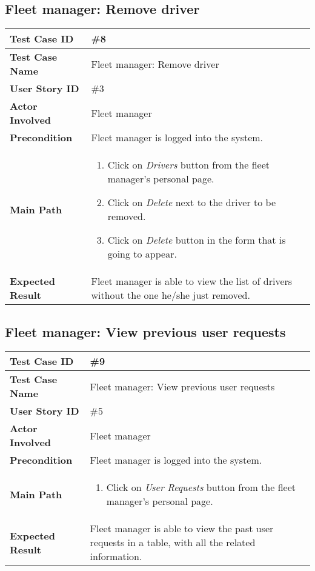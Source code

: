 \subsection{Fleet manager: Remove driver}
\begin{center}
	\begin{tabular} { | m{3.5cm} | m{9.5cm} | }
		\hline
		\textbf{Test Case ID} & \#8\\
		\hline
		\textbf{Test Case Name} & Fleet manager: Remove driver\\
		\hline
		\textbf{User Story ID} & \#3 \\
		\hline
		\textbf{Actor Involved} & Fleet manager\\
		\hline
		\textbf{Precondition} & Fleet manager is logged into the system.\\
		\hline
		\textbf{Main Path} & 
		\begin{enumerate}
			\item Click on \textit{Drivers} button from the fleet manager's personal page.
			\item Click on \textit{Delete} next to the driver to be removed.
			\item Click on \textit{Delete} button in the form that is going to appear.
		\end{enumerate}\\
		\hline
		\textbf{Expected Result} & Fleet manager is able to view the list of drivers without the one he/she just removed.\\
		\hline
	\end{tabular}
\end{center}

\subsection{Fleet manager: View previous user requests}
\begin{center}
	\begin{tabular} { | m{3.5cm} | m{9.5cm} | }
		\hline
		\textbf{Test Case ID} & \#9\\
		\hline
		\textbf{Test Case Name} & Fleet manager: View previous user requests\\
		\hline
		\textbf{User Story ID} & \#5 \\
		\hline
		\textbf{Actor Involved} & Fleet manager\\
		\hline
		\textbf{Precondition} & Fleet manager is logged into the system.\\
		\hline
		\textbf{Main Path} & 
		\begin{enumerate}
			\item Click on \textit{User Requests} button from the fleet manager's personal page.
		\end{enumerate}\\
		\hline
		\textbf{Expected Result} & Fleet manager is able to view the past user requests in a table, with all the related information.\\
		\hline
	\end{tabular}
\end{center}
\newpage
